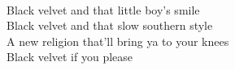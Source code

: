 \\
Black velvet and that little boy's smile \\
Black velvet and that slow southern style \\
A new religion that'll bring ya to your knees \\
Black velvet if you please \\
